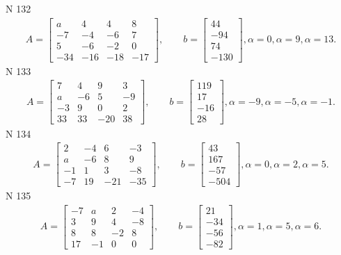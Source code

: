 \documentclass[11pt]{report}
\begin{document}
N 132
\begin{align*}
 A = \left[\begin{matrix}a & 4 & 4 & 8\\-7 & -4 & -6 & 7\\5 & -6 & -2 & 0\\-34 & -16 & -18 & -17\end{matrix}\right],
    \qquad b = \left[\begin{matrix}44\\-94\\74\\-130\end{matrix}\right], \alpha = 0, \alpha = 9, \alpha = 13. 
 \end{align*}
N 133
\begin{align*}
 A = \left[\begin{matrix}7 & 4 & 9 & 3\\a & -6 & 5 & -9\\-3 & 9 & 0 & 2\\33 & 33 & -20 & 38\end{matrix}\right],
    \qquad b = \left[\begin{matrix}119\\17\\-16\\28\end{matrix}\right], \alpha = -9, \alpha = -5, \alpha = -1. 
 \end{align*}
N 134
\begin{align*}
 A = \left[\begin{matrix}2 & -4 & 6 & -3\\a & -6 & 8 & 9\\-1 & 1 & 3 & -8\\-7 & 19 & -21 & -35\end{matrix}\right],
    \qquad b = \left[\begin{matrix}43\\167\\-57\\-504\end{matrix}\right], \alpha = 0, \alpha = 2, \alpha = 5. 
 \end{align*}
N 135
\begin{align*}
 A = \left[\begin{matrix}-7 & a & 2 & -4\\3 & 9 & 4 & -8\\8 & 8 & -2 & 8\\17 & -1 & 0 & 0\end{matrix}\right],
    \qquad b = \left[\begin{matrix}21\\-34\\-56\\-82\end{matrix}\right], \alpha = 1, \alpha = 5, \alpha = 6. 
 \end{align*}
\end{document}
